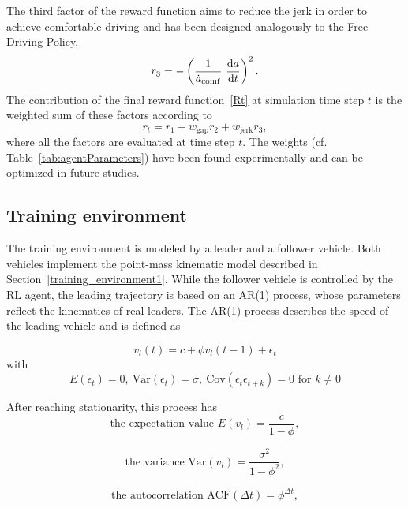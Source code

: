 \documentclass[review]{elsarticle}
\providecommand{\sub}[1]{_{\mathrm{#1}}}  %
\providecommand{\3}{{\ss}}
\begin{document}
The third factor of the reward function aims to reduce the jerk in
order to achieve comfortable driving and has been designed analogously to the Free-Driving Policy, 
\begin{equation}
r_3 = -\left(\frac{1}{\dot{a}\sub{comf}} \ \dv{a}{t}\right)^2.
\end{equation}
%
The contribution of the final reward function~\eqref{Rt}  at simulation time step $t$ is the weighted
sum of these factors according to
\begin{equation}
\label{rt2}
r_t = r_1 + w\sub{gap}r_2+w\sub{jerk}r_3,
\end{equation}
where all the factors are evaluated at time step $t$. The weights (cf.
Table~\ref{tab:agentParameters}) have been found experimentally and
can be optimized in future studies.




\subsection{Training environment}
The training environment is modeled by a leader and a follower vehicle. Both vehicles implement the point-mass kinematic model described in Section~\ref{training_environment1}. While the follower vehicle is controlled by the RL agent, the  leading trajectory is based on an AR(1) process, whose parameters
reflect the kinematics of real leaders. The AR(1) process describes
the speed of the leading vehicle and is defined as 

\begin{equation} \label{eq:AR1}
v_l(t) = c+\phi v_l(t-1)+ \epsilon_t
\end{equation}
with
\begin{equation}
E(\epsilon_t) = 0, \ \text{Var}(\epsilon_t) = \sigma, \ 
\text{Cov}(\epsilon_t\epsilon_{t+k})=0 \text{ for }k\neq 0
\end{equation}

After reaching stationarity, this process has 
\begin{equation}
\label{eq:E_AR1}
\text{the expectation value }E(v_l) = \frac{c}{1-\phi}, 
\end{equation}

\begin{equation}
\label{eq:V_AR1}
\text{the variance }\text{Var}(v_l) = \frac{\sigma^2}{1-\phi^2}, 
\end{equation}

\begin{equation}
\label{eq:ACF_AR1}
\text{the autocorrelation  }\text{ACF}(\Delta t) = \phi^{\Delta t}, 
\end{equation}
\end{document}

